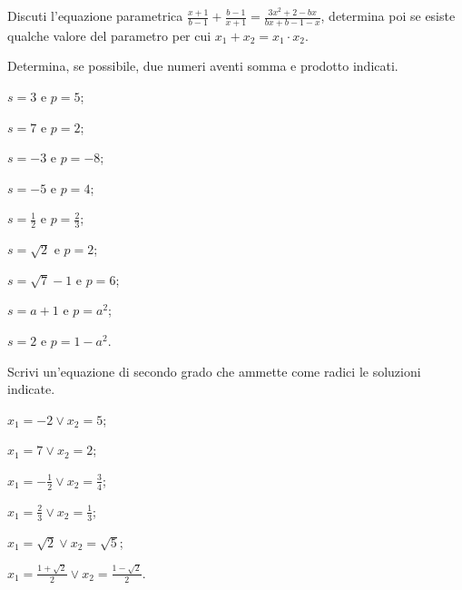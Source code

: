 \begin{esercizio}
 \label{ese:3.87}
Discuti l'equazione parametrica $\frac{x + 1}{b-1} + \frac{b-1}{x + 1}=\frac{3 x^{2} + 2-b x}{b x + b-1-x}$, determina poi se esiste qualche valore del parametro per cui $x_{1} + x_{2} = x_{1} \cdot x_{2}$.
\end{esercizio}
\pagebreak
\begin{esercizio}
 \label{ese:3.88}
Determina, se possibile, due numeri aventi somma e prodotto indicati.
\begin{multicols}{3}
\begin{enumeratea}
\item $s = 3 \text{ e } p = 5$;
\item $s = 7 \text{ e } p = 2$;
\item $s =-3 \text{ e } p =-8$;
\item $s =-5 \text{ e } p = 4$;
\item $s = \frac{1}{2} \text{ e } p = \frac{2}{3}$;
\item $s = \sqrt{2} \text{ e } p = 2$;
\item $s = \sqrt{7}-1 \text{ e } p = 6$;
\item $s = a + 1 \text{ e } p= a^{2}$;
\item $s = 2 \text{ e } p= 1-a^{2}$.
\end{enumeratea}
\end{multicols}
\end{esercizio}


\begin{esercizio}
 \label{ese:3.89}
Scrivi un'equazione di secondo grado che ammette come radici le soluzioni indicate.
\begin{multicols}{2}
\begin{enumeratea}
\item $x_{1} =-2 \vee x_{2} = 5$;
\item $x_{1} = 7 \vee x_{2} = 2$;
\item $x_{1} =-\frac{1}{2} \vee x_{2} = \frac{3}{4}$;
\item $x_{1} = \frac{2}{3} \vee x_{2} = \frac{1}{3}$;
\item $x_{1} = \sqrt{2} \vee x_{2} = \sqrt{5}$;
\item $x_{1} = \frac{1 + \sqrt{2}}{2} \vee x_{2} = \frac{1-\sqrt{2}}{2}$.
\end{enumeratea}
\end{multicols}
\end{esercizio}

